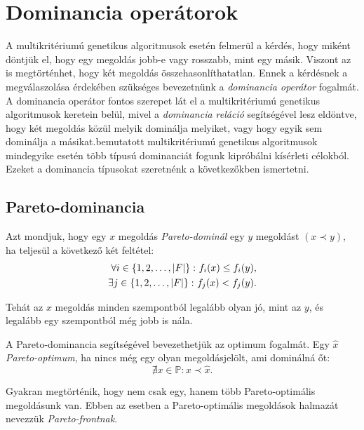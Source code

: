 \section{Dominancia operátorok}
A multikritériumú genetikus algoritmusok esetén felmerül a kérdés, hogy miként döntjük el, hogy egy megoldás jobb-e vagy rosszabb, mint egy másik.
Viszont az is megtörténhet, hogy két megoldás összehasonlíthatatlan.
Ennek a kérdésnek a megválaszolása érdekében szükséges bevezetnünk a \emph{dominancia operátor} fogalmát.
A dominancia operátor fontos szerepet lát el a multikritériumú genetikus algoritmusok keretein belül,
mivel a \emph{dominancia reláció} segítségével lesz eldöntve, hogy két megoldás közül melyik dominálja melyiket, vagy hogy egyik sem dominálja a másikat.bemutatott multikritériumú genetikus algoritmusok mindegyike esetén több típusú dominanciát fogunk kipróbálni kísérleti célokból.
Ezeket a dominancia típusokat szeretnénk a következőkben ismertetni.


\subsection{Pareto-dominancia}
\begin{ert}
  Azt mondjuk, hogy egy $x$ megoldás \emph{Pareto-dominál} egy $y$ megoldást $\left( x \prec y \right)$, ha teljesül a következő két feltétel:
  \begin{align*}
    \forall i \in \left\{ 1, 2, \dots, \lvert F\rvert \right\} \colon f_i(x) \leq f_i(y), \\
    \exists j \in \left\{ 1, 2, \dots, \lvert F\rvert \right\} \colon f_j(x) < f_j(y).
  \end{align*}
\end{ert}

Tehát az $x$ megoldás minden szempontból legalább olyan jó, mint az $y$, és legalább egy szempontból még jobb is nála.


\begin{ert}
  A Pareto-dominancia segítségével bevezethetjük az optimum fogalmát.
  Egy $\hat{x}$ \emph{Pareto-optimum}, ha nincs még egy olyan megoldásjelölt, ami dominálná őt:
  \[
    \nexists x \in \mathbb{P} \colon x \prec \hat{x}.
  \]
\end{ert}


\begin{ert}
  Gyakran megtörténik, hogy nem csak egy, hanem több Pareto-optimális megoldásunk van.
  Ebben az esetben a Pareto-optimális megoldások halmazát nevezzük \emph{Pareto-frontnak}.
\end{ert}


